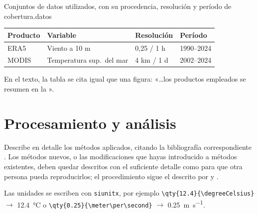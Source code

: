 \begin{tablabima}{Conjuntos de datos utilizados, con su procedencia,
  resolución y período de cobertura.}{datos}
  \begin{tabular}{llll}
    \toprule
    \textbf{Producto} & \textbf{Variable} & \textbf{Resolución} & \textbf{Período} \\
    \midrule
    ERA5   & Viento a 10 m        & 0,25\textdegree{} / 1 h & 1990--2024 \\
    MODIS  & Temperatura sup.\ del mar & 4 km / 1 d        & 2002--2024 \\
    \bottomrule
  \end{tabular}
\end{tablabima}

\noindent
En el texto, la tabla se cita igual que una figura:
«\dots los productos empleados se resumen en la ».

\section{Procesamiento y análisis}

Describe en detalle los métodos aplicados, citando la bibliografía
correspondiente \parencite{Conover1980}. Los métodos nuevos, o las
modificaciones que hayas introducido a métodos existentes, deben quedar
descritos con el suficiente detalle como para que otra persona pueda
reproducirlos; el procedimiento sigue el descrito por \textcite{Villegas1988}
y \textcite{Permitin1970}.

Las unidades se escriben con \verb|siunitx|, por ejemplo
\verb|\qty{12.4}{\degreeCelsius}| $\rightarrow$ \qty{12.4}{\degreeCelsius} o
\verb|\qty{0.25}{\meter\per\second}| $\rightarrow$ \qty{0.25}{\meter\per\second}.

